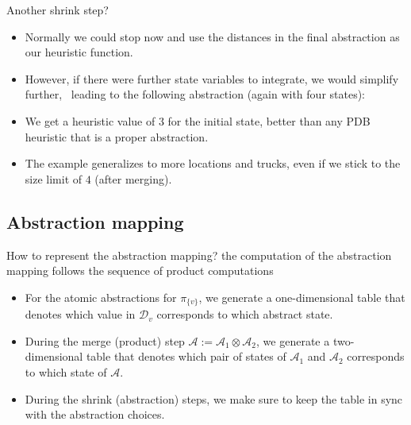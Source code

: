 \documentclass{gkibeamer}
\begin{document}
\begin{frame}{Another shrink step?}
  \begin{itemize}
  \item Normally we could stop now and use the distances in the final
    abstraction as our heuristic function.
  \item However, if there were further state variables to integrate,
    we would simplify further, \eg\ leading to the following
    abstraction (again with four states):
  \end{itemize}
  \begin{center}
    \picshrinkexampletworesult
  \end{center}
  \begin{itemize}
  \item We get a heuristic value of 3 for the initial state,
    \alert{better than any PDB heuristic} that is a proper
    abstraction.
  \item The example generalizes to more locations and trucks, even if
    we stick to the size limit of $4$ (after merging).
  \end{itemize}
\end{frame}

\subsection{Abstraction mapping}

\begin{frame}{How to represent the abstraction mapping?}
   the computation of the abstraction mapping
  follows the sequence of product computations
  \begin{itemize}
  \item For the \alert{atomic abstractions} for $\pi_{\{v\}}$, we
    generate a \alert{one-dimensional table} that denotes which value
    in $\mathcal D_v$ corresponds to which abstract state.
  \item During the \alert{merge} (product) step $\mathcal A :=
    \mathcal A_1 \otimes \mathcal A_2$, we generate a
    \alert{two-dimensional table} that denotes which pair of states of
    $\mathcal A_1$ and $\mathcal A_2$ corresponds to which state of
    $\mathcal A$.
  \item During the \alert{shrink} (abstraction) steps, we make sure to
    keep the table in sync with the abstraction choices.
  \end{itemize}
\end{frame}
\end{document}
